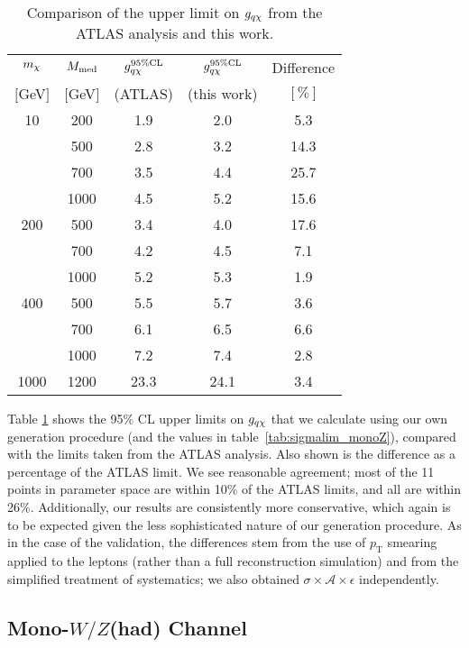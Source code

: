 \begin{table}
\begin{center}
\begin{tabular}{ c | c | c | c | c }
\hline
\hline
$m_{\chi}$ & $M_{\mathrm{med}}$ & $g_{q \chi}^{95\%\mathrm{CL}}$ & $g_{q \chi}^{95\%\mathrm{CL}}$ & Difference \T \\
$[$GeV$]$ & $[$GeV$]$ & (ATLAS) & (this work) & $[\%]$ \B \\
\hline
10 & 200 & 1.9 & 2.0 & 5.3 \T \\
 & 500 & 2.8 & 3.2 & 14.3 \\
 & 700 & 3.5 & 4.4 & 25.7 \\
 & 1000 & 4.5 & 5.2 & 15.6 \\
200 & 500 & 3.4 & 4.0 & 17.6 \T \\
 & 700 & 4.2 & 4.5 & 7.1 \\
 & 1000 & 5.2 & 5.3 & 1.9 \\
400 & 500 & 5.5 & 5.7 & 3.6 \T \\
 & 700 & 6.1 & 6.5 & 6.6 \\
 & 1000 & 7.2 & 7.4 & 2.8 \\
1000 & 1200 & 23.3 & 24.1 & 3.4 \T \B \\
\hline
\hline
\end{tabular}
\end{center}
\caption{Comparison of the upper limit on $g_{q \chi}$ from the ATLAS analysis \cite{Aad:2014monoZlep} and this work.}
\label{tab:monoZvalidation}
\end{table}

Table \ref{tab:monoZvalidation} shows the 95\% CL upper limits on $g_{q \chi}$ that we calculate using our own generation procedure (and the values in table~\ref{tab:sigmalim_monoZ}), compared with the limits taken from the ATLAS analysis. Also shown is the difference as a percentage of the ATLAS limit. We see reasonable agreement; most of the 11 points in parameter space are within 10\% of the ATLAS limits, and all are within 26\%. Additionally, our results are consistently more conservative, which again is to be expected given the less sophisticated nature of our generation procedure. As in the case of the \monojet validation, the differences stem from the use of $p_{\mathrm{T}}$ smearing applied to the leptons (rather than a full reconstruction simulation) and from the simplified treatment of systematics; we also obtained $\sigma \times \mathcal{A} \times \epsilon$ independently.

\subsection{Mono-$W/Z$(had) Channel}
\label{monoWZ_validation}

